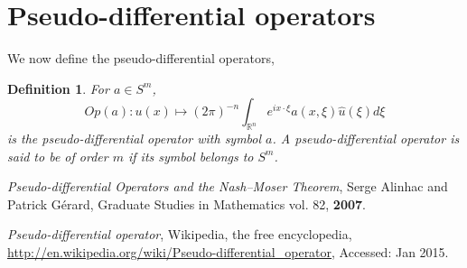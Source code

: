 \documentclass[10pt]{article}
\newcommand{\R}{\mathbb{R}}
\newtheorem{defn}{Definition}
\begin{document}
\section{Pseudo-differential operators}
We now define the pseudo-differential operators,
\begin{defn}
For $a \in S^m$,
\[
Op(a) : u(x) \mapsto (2\pi)^{-n} \int_{\R^n} e^{i x \cdot \xi} a(x,\xi) \hat{u}(\xi) d\xi
\]
is the pseudo-differential operator with symbol $a$.
A pseudo-differential operator is said to be of order $m$ if its symbol belongs to $S^m$.
\end{defn}


%
\begin{thebibliography}{9}
\emph{Pseudo-differential Operators and the Nash--Moser Theorem},
Serge Alinhac and Patrick G\'erard,
Graduate Studies in Mathematics vol. 82,
\textbf{2007}.

\emph{Pseudo-differential operator},
Wikipedia, the free encyclopedia,
\url{http://en.wikipedia.org/wiki/Pseudo-differential_operator},
Accessed: Jan 2015.
\end{thebibliography}
\end{document}
